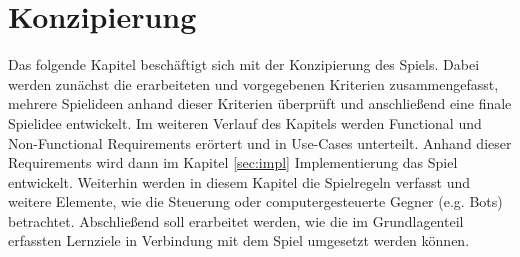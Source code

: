 \section{Konzipierung}
Das folgende Kapitel beschäftigt sich mit der Konzipierung des Spiels. Dabei werden zunächst die erarbeiteten und vorgegebenen Kriterien zusammengefasst, mehrere Spielideen anhand dieser Kriterien überprüft und anschließend eine finale Spielidee entwickelt. Im weiteren Verlauf des Kapitels werden Functional und Non-Functional Requirements erörtert und in Use-Cases unterteilt. Anhand dieser Requirements wird dann im Kapitel \ref{sec:impl} Implementierung das Spiel entwickelt. Weiterhin werden in diesem Kapitel die Spielregeln verfasst und weitere Elemente, wie die Steuerung oder computergesteuerte Gegner (e.g. Bots) betrachtet. Abschließend soll erarbeitet werden, wie die im Grundlagenteil erfassten Lernziele in Verbindung mit dem Spiel umgesetzt werden können.
